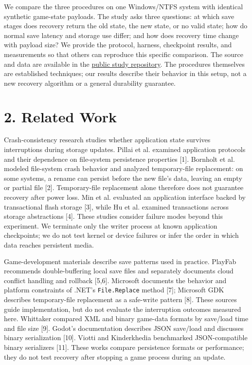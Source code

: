 \documentclass{jepcs}
\begin{document}
We compare the three procedures on one Windows/NTFS system with identical synthetic game-state payloads. The study asks three questions: at which save stages does recovery return the old state, the new state, or no valid state; how do normal save latency and storage use differ; and how does recovery time change with payload size? We provide the protocol, harness, checkpoint results, and measurements so that others can reproduce this specific comparison. The source and data are available in the \href{https://github.com/zekk01/game-save-study}{public study repository}. The procedures themselves are established techniques; our results describe their behavior in this setup, not a new recovery algorithm or a general durability guarantee.

\section{2. Related Work}

Crash-consistency research studies whether application state survives interruptions during storage updates. Pillai et al. examined application protocols and their dependence on file-system persistence properties [1]. Bornholt et al. modeled file-system crash behavior and analyzed temporary-file replacement: on some systems, a rename can persist before the new file's data, leaving an empty or partial file [2]. Temporary-file replacement alone therefore does not guarantee recovery after power loss. Min et al. evaluated an application interface backed by transactional flash storage [3], while Hu et al. examined transactions across storage abstractions [4]. These studies consider failure modes beyond this experiment. We terminate only the writer process at known application checkpoints; we do not test kernel or device failures or infer the order in which data reaches persistent media.

Game-development materials describe save patterns used in practice. PlayFab recommends double-buffering local save files and separately documents cloud conflict handling and rollback [5,6]. Microsoft documents the behavior and platform constraints of .NET's \texttt{File.Replace} method [7]; Microsoft GDK describes temporary-file replacement as a safe-write pattern [8]. These sources guide implementation, but do not evaluate the interruption outcomes measured here. Whittaker compared XML and binary game-data formats by save/load time and file size [9]. Godot's documentation describes JSON save/load and discusses binary serialization [10]. Viotti and Kinderkhedia benchmarked JSON-compatible binary serializers [11]. These works compare persistence formats or performance; they do not test recovery after stopping a game process during an update.
\end{document}
